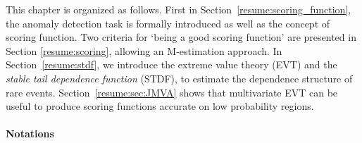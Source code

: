 This chapter is organized as follows.
First in Section~\ref{resume:scoring_function}, the anomaly detection task is formally introduced as well as the concept of scoring function. Two criteria for `being a good scoring function' are presented in Section \ref{resume:scoring}, allowing an M-estimation approach. In Section~\ref{resume:stdf}, we introduce the extreme value theory (EVT) and the \emph{stable tail dependence function} (STDF), to estimate the dependence structure of rare events. Section~\ref{resume:sec:JMVA} shows that multivariate EVT can be useful to produce scoring functions accurate on low probability regions.


\paragraph{Notations}

